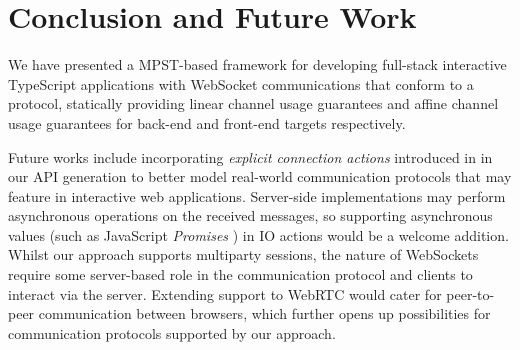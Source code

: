 \section{Conclusion and Future Work}
We have presented a MPST-based framework for developing full-stack interactive
TypeScript applications with WebSocket communications that conform to a
protocol, statically providing linear channel usage guarantees and affine
channel usage guarantees for back-end and front-end targets respectively.

Future works include incorporating \textit{explicit connection actions}
introduced in \cite{ExplicitConnections} in our API generation to better model
real-world communication protocols that may feature in interactive web
applications.
Server-side implementations may perform asynchronous operations on the 
received messages, so supporting asynchronous values (such as JavaScript 
\textit{Promises} \cite{promise}) in IO actions would be a welcome addition.
Whilst our approach supports multiparty sessions, the nature of
WebSockets require some server-based role in the communication protocol and
clients to interact via the server.
Extending support to WebRTC \cite{WebRTC} would
cater for peer-to-peer communication between browsers, which further opens up
possibilities for communication protocols supported by our approach.


